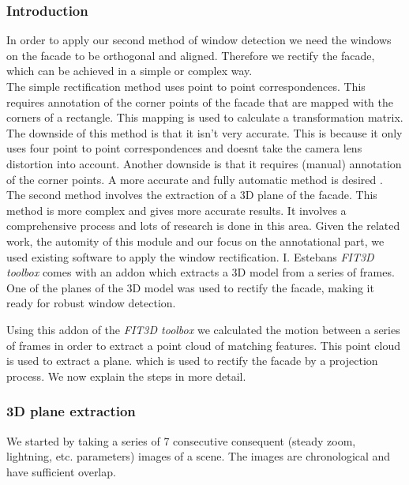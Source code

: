 \subsubsection{Introduction}
In order to apply our second method of window detection
we need the windows on the facade to be orthogonal and aligned.
Therefore we rectify the facade, which can be achieved in a simple or complex way.\\

The simple rectification method uses point to point correspondences. This 
requires annotation of the corner points of the facade that are mapped with the
corners of a rectangle. This mapping is used to calculate a transformation matrix. 
 The downside of this method is that it isn't very accurate.
This is because it only uses four point to point correspondences 
 and doesnt take the camera lens distortion into account.
 Another downside is that it requires (manual) annotation of the corner points.
A more accurate and fully automatic method is desired .\\

The second method involves the extraction of a 3D plane of the facade. This 
method is more complex and gives more accurate results. It involves a
comprehensive process and lots of research is done in this area. 
Given the related work, the automity of this module and our focus on the annotational part,
we used existing software to apply the window rectification.
I. Estebans \emph{FIT3D toolbox} \cite{Fit3d} comes with an addon which extracts a 3D model from a
series of frames.  One of the planes of the 3D model was used to rectify the
facade, making it ready for robust window detection. 

Using this addon of the \emph{FIT3D toolbox} \cite{Fit3d} we calculated the motion between a
series of frames in order to extract a point cloud of matching features. This
point cloud is used to extract a plane.  which is used to rectify the facade by
a projection process.  We now explain the steps in more detail.

\subsubsection{3D plane extraction}
We started by taking a series of 7 consecutive consequent (steady zoom, lightning, etc. parameters) images of a scene.
The images are chronological and have sufficient overlap. 


